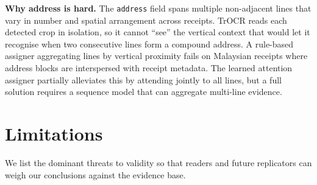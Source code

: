 \documentclass[conference]{IEEEtran}
\begin{document}
\textbf{Why address is hard.}
The \texttt{address} field spans multiple non-adjacent lines that
vary in number and spatial arrangement across receipts.  TrOCR reads
each detected crop in isolation, so it cannot ``see'' the vertical
context that would let it recognise when two consecutive lines form
a compound address.  A rule-based assigner aggregating lines by
vertical proximity fails on Malaysian receipts where address blocks
are interspersed with receipt metadata.  The learned attention
assigner partially alleviates this by attending jointly to all
lines, but a full solution requires a sequence model that can
aggregate multi-line evidence.


\section{Limitations}
\label{sec:limitations}

We list the dominant threats to validity so that readers and future
replicators can weigh our conclusions against the evidence base.
\end{document}
